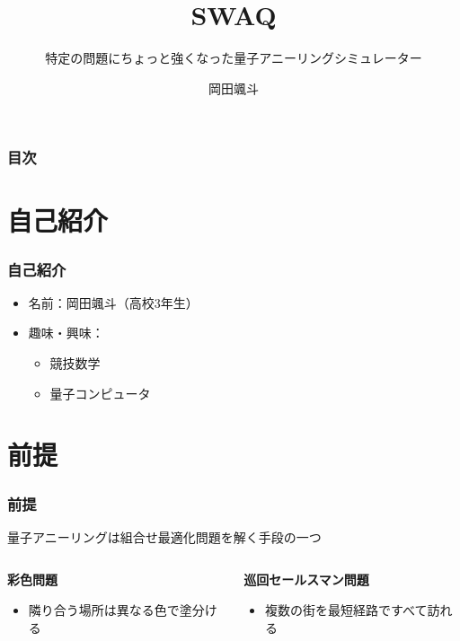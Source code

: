 \title[Swaq]{\color{black} \LARGE SWAQ}
\subtitle[ちょっと強いQAS]{特定の問題にちょっと強くなった量子アニーリングシミュレーター}
\author[岡田颯斗]{岡田颯斗}
\date{}
\begin{frame}{}
\titlepage
\end{frame}
\large

\begin{frame}
  \frametitle{目次}
  \tableofcontents
\end{frame}


\section{自己紹介}
\begin{frame}
  \frametitle{自己紹介}
  \begin{itemize}
      \item 名前：岡田颯斗（高校3年生）
      \item 趣味・興味：
      \begin{itemize}
          \item 競技数学
          \item 量子コンピュータ
      \end{itemize}
  \end{itemize}
\end{frame}

\section{前提}
\begin{frame}
  \frametitle{前提}

  {\Large \color{important_font}  量子アニーリングは組合せ最適化問題を解く手段の一つ}
  \vspace{5mm}

  \begin{columns}
    \begin{column}{0.45\textwidth}
      \textbf{彩色問題}
      \begin{itemize}
          \item 隣り合う場所は異なる色で塗分ける
      \end{itemize}
    \end{column}

    \begin{column}{0.45\textwidth}
      \textbf{巡回セールスマン問題}
      \begin{itemize}
          \item 複数の街を最短経路ですべて訪れる
      \end{itemize}
    \end{column}
  \end{columns}
  \vspace{5mm}
\end{frame}

